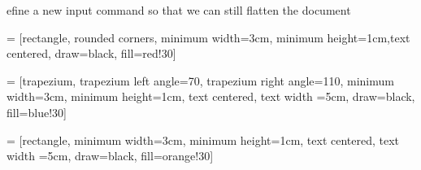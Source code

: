\newenvironment{myRaggedRight}
  {\RaggedRight\setlength{\parindent}{15pt}} %
  {}






\let\estinput= define a new input command so that we can still flatten the document

\newcommand{\estwide}[3]{
		\vspace{.75ex}{
			\begin{tabular*}
			{\textwidth}{@{\hskip\tabcolsep\extracolsep\fill}l*{#2}{#3}}
			\toprule
			\estinput{#1}
			\bottomrule
			\addlinespace[.75ex]
			\end{tabular*}
			}
		}	

\newcommand{\estauto}[3]{
		\vspace{.75ex}{
			\begin{tabular}{l*{#2}{#3}}
			\toprule
			\estinput{#1}
			\bottomrule
			\addlinespace[.75ex]
			\end{tabular}
			}
		}

\newcommand{\specialcell}[2][c]{%
    \begin{tabular}[#1]{@{}c@{}}#2\end{tabular}
}



    
\usepackage{tikz}
\usetikzlibrary{shapes.geometric, arrows}

 = [rectangle, rounded corners, minimum width=3cm, minimum height=1cm,text centered, draw=black, fill=red!30]

 = [trapezium, trapezium left angle=70, trapezium right angle=110, minimum width=3cm, minimum height=1cm, text centered, text width =5cm, draw=black, fill=blue!30]

 = [rectangle, minimum width=3cm, minimum height=1cm, text centered, text width =5cm, draw=black, fill=orange!30]

